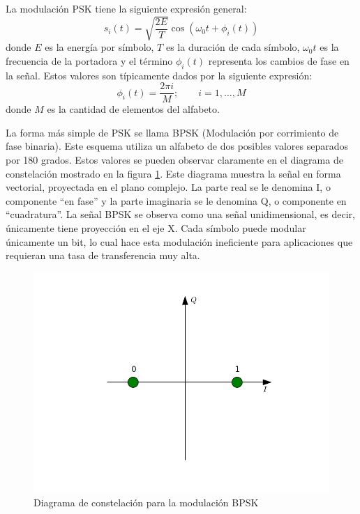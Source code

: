 La modulaci\'on PSK tiene la siguiente expresi\'on general:
\begin{equation}\label{eq:pskgen}
s_i(t)=\sqrt{\frac{2E}{T}}\cos(\omega_0t+\phi_i(t))
\end{equation}
donde $E$ es la energ\'ia por s\'imbolo, $T$ es la duraci\'on de cada s\'imbolo,
$\omega_0t$ es la frecuencia de la portadora y el t\'ermino $\phi_i(t)$
representa los cambios de fase en la se\~nal. Estos valores son t\'ipicamente
dados por la siguiente expresi\'on:
\begin{equation}\label{eq:levelfase}
\phi_i(t)=\frac{2\pi i}{M}; \qquad i=1,\ldots,M 
\end{equation}
donde $M$ es la cantidad de elementos del alfabeto.

La forma m\'as simple de PSK se llama BPSK (Modulaci\'on por corrimiento de fase binaria). Este esquema utiliza un alfabeto de
dos posibles valores separados por 180 grados. Estos valores se pueden observar
claramente en el diagrama de constelaci\'on mostrado en la figura
\ref{fig:bpskconst}. Este diagrama muestra la se\~nal en forma vectorial,
proyectada en el plano complejo. La parte real se le denomina I, o componente ``en fase'' y
la parte imaginaria se le denomina Q, o componente en ``cuadratura''. La se\~nal
BPSK se observa como una se\~nal unidimensional, es decir, \'unicamente tiene
proyecci\'on en el eje X. Cada s\'imbolo puede modular \'unicamente un bit, lo
cual hace esta modulaci\'on ineficiente para aplicaciones que requieran una tasa
de transferencia muy alta.
\begin{figure}[hpt]
\centering
	\includegraphics[width=5.5in]{figs/bpsk}
	\caption{Diagrama de constelaci\'on para la modulaci\'on BPSK}
	\label{fig:bpskconst}
\end{figure}

